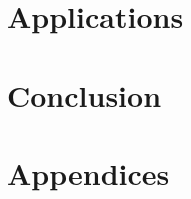 \documentclass[a4paper, 11pt, twoside]{StyleThese}
\begin{document}
\dominitoc


\frontmatter
%
%
%

\cleardoublepage
\tableofcontents

\cleardoublepage
\listoffigures {} \adjustmtc
\listoftables {} \adjustmtc

\mainmatter

\setcounter{chapter}{0}  %

\part{Applications}
\part{Conclusion}

\part{Appendices}

\begin{appendix}
\end{appendix}

\backmatter

\clearpage



\end{document}
